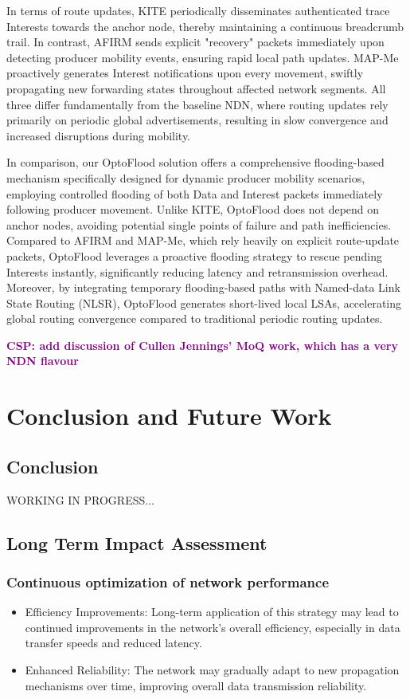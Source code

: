 \documentclass[conference]{IEEEtran}
\newcommand{\csp}[1]{\textbf{\textcolor{purple}{CSP: #1}}}
\begin{document}
In terms of route updates, KITE periodically disseminates authenticated trace Interests towards the anchor node, thereby maintaining a continuous breadcrumb trail. In contrast, AFIRM sends explicit "recovery" packets immediately upon detecting producer mobility events, ensuring rapid local path updates. MAP-Me proactively generates Interest notifications upon every movement, swiftly propagating new forwarding states throughout affected network segments. All three differ fundamentally from the baseline NDN, where routing updates rely primarily on periodic global advertisements, resulting in slow convergence and increased disruptions during mobility.

In comparison, our OptoFlood solution offers a comprehensive flooding-based mechanism specifically designed for dynamic producer mobility scenarios, employing controlled flooding of both Data and Interest packets immediately following producer movement. Unlike KITE, OptoFlood does not depend on anchor nodes, avoiding potential single points of failure and path inefficiencies. Compared to AFIRM and MAP-Me, which rely heavily on explicit route-update packets, OptoFlood leverages a proactive flooding strategy to rescue pending Interests instantly, significantly reducing latency and retransmission overhead. Moreover, by integrating temporary flooding-based paths with Named-data Link State Routing (NLSR), OptoFlood generates short-lived local LSAs, accelerating global routing convergence compared to traditional periodic routing updates.

\csp{add discussion of Cullen Jennings' MoQ work, which has a very NDN flavour}

\section{Conclusion and Future Work}
\subsection{Conclusion}
WORKING IN PROGRESS...
\subsection{Long Term Impact Assessment}
\subsubsection{Continuous optimization of network performance}
\begin{itemize}
    \item Efficiency Improvements: Long-term application of this strategy may lead to continued improvements in the network's overall efficiency, especially in data transfer speeds and reduced latency.
    \item Enhanced Reliability: The network may gradually adapt to new propagation mechanisms over time, improving overall data transmission reliability.
\end{itemize}
\end{document}
